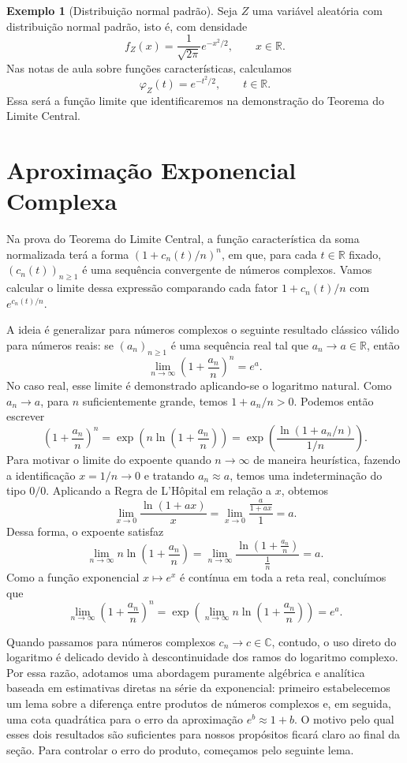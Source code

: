 \documentclass[12pt,portuguese]{article}
\theoremstyle{definition}
\newtheorem{example}[example]{Exemplo}
\theoremstyle{plainexercise}
\theoremstyle{starredexercise}
\theoremstyle{definition}
\begin{document}
\begin{example}[Distribuição normal padrão]\label{ex:normal}
Seja $Z$ uma variável aleatória com distribuição normal padrão, isto é,
com densidade
\[
f_Z(x)=\frac{1}{\sqrt{2\pi}}e^{-x^2/2},
\qquad x\in\mathbb{R}.
\]
Nas notas de aula sobre funções características, calculamos
\[
\varphi_Z(t)=e^{-t^2/2},
\qquad t\in\mathbb{R}.
\]
Essa será a função limite que identificaremos na demonstração do
Teorema do Limite Central.
\end{example}

\section{Aproximação Exponencial Complexa}\label{sec:preliminares-complexos}

Na prova do Teorema do Limite Central, a função característica da soma
normalizada terá a forma $(1+c_n(t)/n)^n$, em que, para cada $t\in\mathbb{R}$
fixado, $(c_n(t))_{n\geqslant1}$ é uma sequência convergente de números complexos.
Vamos calcular o limite dessa expressão comparando cada fator $1+c_n(t)/n$
com $e^{c_n(t)/n}$.

A ideia é generalizar para números complexos o seguinte resultado clássico
válido para números reais: se $(a_n)_{n\geqslant 1}$ é uma sequência real tal que
$a_n\to a\in\mathbb{R}$, então
\[
\lim_{n\to\infty}\left(1+\frac{a_n}{n}\right)^{\!n} = e^a.
\]
No caso real, esse limite é demonstrado aplicando-se o logaritmo natural. Como
$a_n\to a$, para $n$ suficientemente grande, temos $1+a_n/n > 0$. Podemos então
escrever
\[
\left(1+\frac{a_n}{n}\right)^{\!n} = \exp\left(n\ln\left(1+\frac{a_n}{n}\right)\right)
= \exp\left(\frac{\ln(1+a_n/n)}{1/n}\right).
\]
Para motivar o limite do expoente quando $n\to\infty$ de maneira heurística, fazendo a identificação
$x=1/n\to 0$ e tratando $a_n\approx a$, temos uma indeterminação do tipo
$0/0$. Aplicando a Regra de L'Hôpital em relação a $x$, obtemos
\[
\lim_{x\to 0}\frac{\ln(1+ax)}{x}
= \lim_{x\to 0}\frac{\frac{a}{1+ax}}{1}
= a.
\]
Dessa forma, o expoente satisfaz
\[
\lim_{n\to\infty} n\ln\left(1+\frac{a_n}{n}\right)
=
\lim_{n\to\infty} \frac{ \ln\left(1+\frac{a_n}{n}\right) } { \frac{1}{n} }
 = a.
\]
Como a função exponencial $x\mapsto e^x$ é contínua em toda a reta real, concluímos que
\[
\lim_{n\to\infty}\left(1+\frac{a_n}{n}\right)^{\!n}
= \exp\left(\lim_{n\to\infty}n\ln\left(1+\frac{a_n}{n}\right)\right)
= e^a.
\]

Quando passamos para números complexos $c_n\to c\in\mathbb{C}$, contudo, o uso direto do
logaritmo é delicado devido à descontinuidade dos ramos do logaritmo complexo. Por essa razão,
adotamos uma abordagem puramente algébrica e analítica baseada em estimativas diretas na série
da exponencial: primeiro estabelecemos um lema sobre a diferença entre produtos de números complexos
e, em seguida, uma cota quadrática para o erro da aproximação $e^b\approx 1+b$.
O motivo pelo qual esses dois resultados são suficientes para nossos propósitos ficará claro ao final da
seção. Para controlar o erro do produto, começamos pelo seguinte lema.
\end{document}
